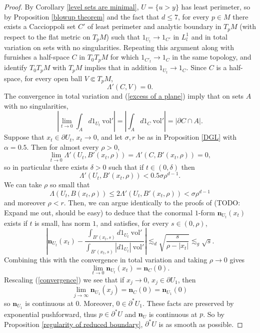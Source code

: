 \documentclass[reqno,12pt,letterpaper]{amsart}
\newcommand{\normal}{\mathbf n}
\newcommand{\vol}{\mathrm{vol}}
\theoremstyle{definition}
\numberwithin{equation}{section}
\begin{document}
\begin{proof}
By Corollary \ref{level sets are minimal}, $U = \{u > y\}$ has least perimeter, so by Proposition \ref{blowup theorem} and the fact that $d \leq 7$, for every $p \in M$ there exists a Caccioppoli set $C'$ of least perimeter and analytic boundary in $T_pM$ (with respect to the flat metric on $T_pM$) such that $1_{U_t} \to 1_{C'}$ in $L^1_l$ and in total variation on sets with no singularities.
Repeating this argument along with \cite[Theorem 9.3]{Giusti77} furnishes a half-space $C$ in $T_0T_pM$ for which $1_{C'_t} \to 1_C$ in the same topology, and identify $T_0T_pM$ with $T_pM$ implies that in addition $1_{U_t} \to 1_C$.
Since $C$ is a half-space, for every open ball $V \Subset T_pM$,
\begin{equation}\label{excess of a plane}
\Lambda'(C, V) = 0.
\end{equation}
The convergence in total variation and (\ref{excess of a plane}) imply that on sets $A$ with no singularities,
$$\left|\lim_{t \to 0} \int_A d1_{U_t} ~\vol'\right| = \left|\int_A d1_C ~\vol'\right| = |\partial C \cap A|.$$
Suppose that $x_t \in \partial U_t$, $x_t \to 0$, and let $\sigma,r$ be as in Proposition \ref{DGL} with $\alpha = 0.5$.
Then for almost every $\rho > 0$,
$$\lim_{t \to 0} \Lambda'(U_t, B'(x_t, \rho)) = \Lambda'(C, B'(x_t, \rho)) = 0,$$
so in particular there exists $\delta > 0$ such that if $t \in (0, \delta)$ then
$$\Lambda'(U_t, B'(x_t, \rho)) < 0.5 \sigma \rho^{d - 1}.$$
We can take $\rho$ so small that
$$\Lambda(U_t, B(x_t, \rho)) \leq 2\Lambda'(U_t, B'(x_t, \rho)) < \sigma \rho^{d - 1}$$
and moreover $\rho < r$.
Then, we can argue identically to the proofs of \cite[Teorema 5.7, Corollario 6.3]{Miranda66} (TODO: Expand me out, should be easy) to deduce that the conormal $1$-form $\normal_{U_t}(x_t)$ exists if $t$ is small, has norm $1$, and satisfies, for every $s \in (0, \rho)$,
$$\left|\normal_{U_t}(x_t) - \frac{\int_{B'(x_t, s)} d1_{U_t} ~\vol'}{\int_{B'(x_t, s)} |d1_{U_t}| ~\vol'}\right| \lesssim_d \sqrt{\frac{s}{\rho - |x_t|}} \lesssim_g \sqrt s.$$
Combining this with the convergence in total variation and taking $\rho \to 0$ gives
\begin{equation}
\label{convergence}
\lim_{t \to 0} \normal_{U_t}(x_t) = \normal_C(0).
\end{equation}
Rescaling (\ref{convergence}) we see that if $x_j \to 0$, $x_j \in \partial U_1$, then
$$\lim_{j \to \infty} \normal_{U_1}(x_j) = \normal_C(0) = \normal_{U_1}(0)$$
so $\normal_{U_1}$ is continuous at $0$. Moreover, $0 \in \partial^* U_1$.
These facts are preserved by exponential pushforward, thus $p \in \partial^* U$ and $\normal_U$ is continuous at $p$.
So by Proposition \ref{regularity of reduced boundary}, $\partial^* U$ is as smooth as possible.
\end{proof}
\end{document}
